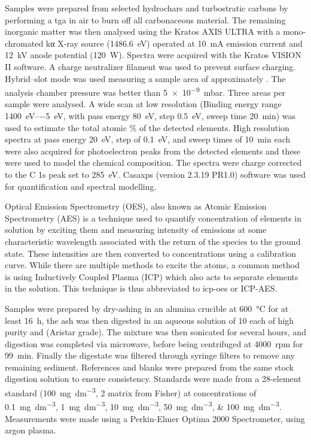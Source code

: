 Samples were prepared from selected \glspl{hydrochar} and \glspl{turbostratic carbon} by performing a \acrshort{tga} in air to burn off all carbonaceous material. The remaining inorganic matter was then analysed using the Kratos AXIS ULTRA with a mono-chromated k\textgreek{α} X-ray source (\qty{1486.6}{\electronvolt}) operated at \qty{10}{\mA} emission current and \qty{12}{\kilo\volt} anode potential (\qty{120}{\watt}). Spectra were acquired with the Kratos VISION II software. A charge neutralizer filament was used to prevent surface charging. Hybrid–slot mode was used measuring a sample area of approximately . The analysis chamber pressure was better than \qty{5e-9}{\milli\bar}. Three areas per sample were analysed. A wide scan at low resolution (Binding energy range \qtyrange{1400}{-5}{\electronvolt}, with pass energy \qty{80}{\electronvolt}, step \qty{0.5}{\electronvolt}, sweep time \qty{20}{\minute}) was used to estimate the total atomic \% of the detected elements. High resolution spectra at pass energy \qty{20}{\electronvolt}, step of \qty{0.1}{\electronvolt}, and sweep times of \qty{10}{\minute} each were also acquired for photoelectron peaks from the detected elements and these were used to model the chemical composition. The spectra were charge corrected to the C 1s peak set to \qty{285}{\electronvolt}. Casaxps (version 2.3.19 PR1.0) software\citep{fairley2021systematic} was used for quantification and spectral modelling.

Optical Emission Spectrometry (OES), also known as Atomic Emission Spectrometry (AES) is a technique used to quantify concentration of elements in solution by exciting them and measuring intensity of emissions at some characteristic wavelength associated with the return of the species to the ground state. These intensities are then converted to concentrations using a calibration curve. While there are multiple methods to excite the atoms, a common method is using Inductively Coupled Plasma (ICP) which also acts to separate elements in the solution. This technique is thus abbreviated to \acrshort{icp-oes} or ICP-AES.\citep{Hinners1988interlaboratory}

Samples were prepared by dry-ashing in an alumina crucible at \qty{600}{\degreeCelsius} for at least \qty{16}{\hour}, the ash was then digested in an aqueous solution of \qty{10}{\volpercent} each of high purity  and  (Aristar grade). The mixture was then sonicated for several hours, and digestion was completed via microwave, before being centrifuged at \qty{4000}{rpm} for \qty{99}{\minute}. Finally the digestate was filtered through syringe filters to remove any remaining sediment. References and blanks were prepared from the same stock digestion solution to ensure consistency. Standards were made from a 28-element standard (\qty{100}{\mg\per\dm\cubed}, \qty{2}{\volpercent}  matrix from Fisher) at concentrations of \qtylist[list-units = single]{0.1;1;10;50;100}{\mg\per\dm\cubed}. Measurements were made using a Perkin-Elmer Optima 2000 Spectrometer, using argon plasma.


